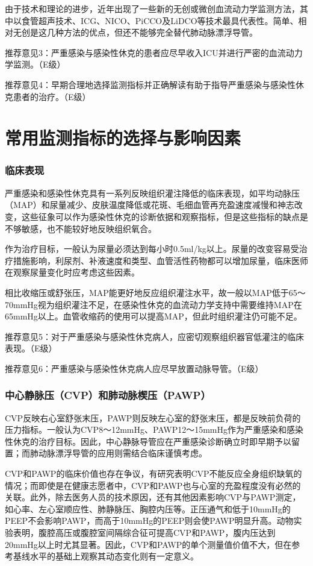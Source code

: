 由于技术和理论的进步，近年出现了一些新的无创或微创血流动力学监测方法，其中以食管超声技术、ICG、NICO、PiCCO及LiDCO等技术最具代表性。简单、相对无创是这几种方法的优点，但还不能够完全替代肺动脉漂浮导管。

推荐意见3：严重感染与感染性休克的患者应尽早收入ICU并进行严密的血流动力学监测。（E级）

推荐意见4：早期合理地选择监测指标并正确解读有助于指导严重感染与感染性休克患者的治疗。（E级）

\section{常用监测指标的选择与影响因素}

\subsubsection{临床表现}

严重感染和感染性休克具有一系列反映组织灌注降低的临床表现，如平均动脉压（MAP）和尿量减少、皮肤温度降低或花斑、毛细血管再充盈速度减慢和神志改变，这些征象可以作为感染性休克的诊断依据和观察指标，但是这些指标的缺点是不够敏感，也不能较好地反映组织氧合。

作为治疗目标，一般认为尿量必须达到每小时0.5ml/kg以上。尿量的改变容易受治疗措施影响，利尿剂、补液速度和类型、血管活性药物都可以增加尿量，临床医师在观察尿量变化时应考虑这些因素。

相比收缩压或舒张压，MAP能更好地反应组织灌注水平，故一般以MAP低于65～70mmHg视为组织灌注不足，在感染性休克的血流动力学支持中需要维持MAP在65mmHg以上。血管收缩药的使用可以提高MAP，但此时组织灌注仍可能不足。

推荐意见5：对于严重感染与感染性休克病人，应密切观察组织器官低灌注的临床表现。（E级）

推荐意见6：严重感染与感染性休克病人应尽早放置动脉导管。（E级）

\subsubsection{中心静脉压（CVP）和肺动脉楔压（PAWP）}

CVP反映右心室舒张末压，PAWP则反映左心室的舒张末压，都是反映前负荷的压力指标。一般认为CVP8～12mmHg、PAWP12～15mmHg作为严重感染和感染性休克的治疗目标。因此，中心静脉导管应在严重感染诊断确立时即早期予以留置；而肺动脉漂浮导管的应用则需结合临床谨慎考虑。

CVP和PAWP的临床价值也存在争议，有研究表明CVP不能反应全身组织缺氧的情况；而即使是在健康志愿者中，CVP和PAWP也与心室的充盈程度没有必然的关联。此外，除去医务人员的技术原因，还有其他因素影响CVP与PAWP测定，如心率、左心室顺应性、肺静脉压、胸腔内压等。正压通气和低于10mmHg的PEEP不会影响PAWP，而高于10mmHg的PEEP则会使PAWP明显升高。动物实验表明，腹腔高压或腹腔室间隔综合征可提高CVP和PAWP，腹内压达到20mmHg以上时尤其显著。因此，CVP和PAWP的单个测量值价值不大，但在参考基线水平的基础上观察其动态变化则有一定意义。

